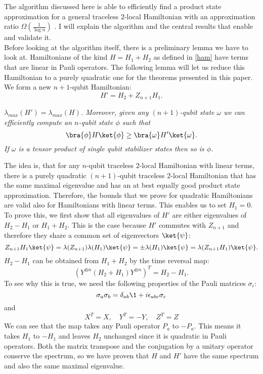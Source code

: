 The algorithm discussed here is able to efficiently find a product state approximation for a general traceless $2$-local Hamiltonian with an approximation ratio $\Omega(\frac{1}{\log n})$ \cite{bravyi19}.
I will explain the algorithm and the central results that enable and validate it.\\
Before looking at the algorithm itself, there is a preliminary lemma we have to look at.
Hamiltonians of the kind $H = H_1+H_2$ as defined in \eqref{ham} have terms that are linear in Pauli operators.
The following lemma will let us reduce this Hamiltonian to a purely quadratic one for the theorems presented in this paper.
We form a new $n+1$-qubit Hamiltonian: \[
H'=H_2+Z_{n+1}H_1
.\]

\begin{lma}\cite{bravyi19}
	\emph{$\lambda_{max}\left( H' \right) =\lambda_{max}\left( H \right)$. Moreover, given any $(n+1)$-qubit state  $\omega$ we can efficiently compute an $n$-qubit state $\phi$ such that \[
	\bra{\phi}H\ket{\phi} \ge \bra{\omega}H'\ket{\omega}
	.\]
If $\omega$ is a tensor product of single qubit stabilizer states then so is $\phi$.}
\end{lma}
\noindent The idea is, that for any $n$-qubit traceless $2$-local Hamiltonian with linear terms, there is a purely quadratic $(n+1)$-qubit traceless $2$-local Hamiltonian that has the same maximal eigenvalue and has an at best equally good product state approximation.
Therefore, the bounds that we prove for quadratic Hamiltonians are valid also for Hamiltonians with linear terms.
This enables us to set $H_1=0$.
To prove this, we first show that all eigenvalues of $H'$ are either eigenvalues of $H_2-H_1$ or $H_1+H_2$.
This is the case because $H'$ commutes with $Z_{n+1}$ and therefore they share a common set of eigenvectors $\ket{\psi}$: \[
Z_{n+1}H_1\ket{\psi} = \lambda(Z_{n+1})\lambda(H_1)\ket{\psi}=\pm \lambda(H_1)\ket{\psi} = \lambda(Z_{n+1}H_1)\ket{\psi}
.\]
$H_2-H_1$ can be obtained from $H_1+H_2$ by the time reversal map:
\[
	\left( Y^{\otimes n}\left( H_2+H_1 \right) Y^{\otimes n} \right) ^{T} = H_2-H_1
.\]
To see why this is true, we need the following properties of the Pauli matrices $\sigma_{i}$: \[
	\sigma_a\sigma_b=\delta_{ab}\1 + i\epsilon_{abc}\sigma_c
\]
and \[
	X^{T}=X, \quad Y^{T}=-Y, \quad Z^{T}=Z
\]
We can see that the map takes any Pauli operator $P_a$ to $-P_a$.
This means it takes  $H_1$ to $-H_1$ and leaves $H_2$ unchanged since it is quadratic in Pauli operators.
Both the matrix transpose and the conjugation by a unitary operator conserve the spectrum, so we have proven that  $H$ and $H'$ have the same spectrum and also the same maximal eigenvalue.

